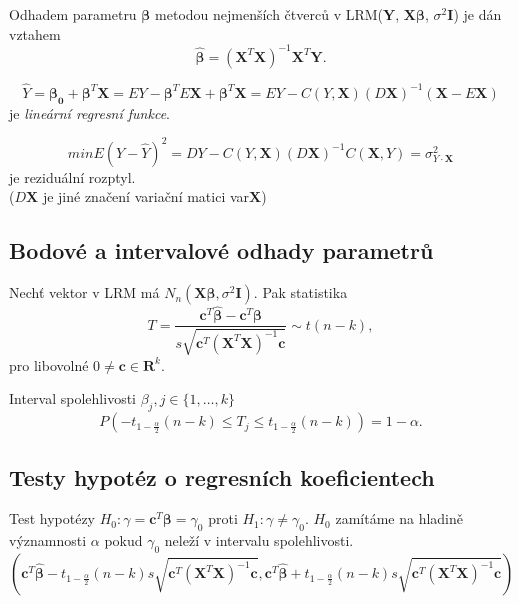 \begin{theorem}
Odhadem parametru $\pmb{\beta}$ metodou nejmenších čtverců v LRM($\mathbf{Y}$, $\mathbf{X} \pmb{\beta}$, $\sigma^2 \mathbf{I}$) je dán vztahem $$\pmb{\hat{\beta}} = \left( \mathbf{X}^T \mathbf{X} \right) ^{-1} \mathbf{X}^T \mathbf{Y}.$$
\end{theorem}

\begin{notes}$$
\hat{Y} = \mathbf{\beta_0} + \pmb{\beta}^T \mathbf{X} = E Y - \pmb{\beta}^T E \mathbf{X} + \pmb{\beta}^T \mathbf{X} = E Y - C\left( Y, \mathbf{X} \right) \left( D \mathbf{X} \right) ^ {-1} \left( \mathbf{X} - E \mathbf{X} \right)$$
je \textit{lineární regresní funkce}. 

$$min E (Y - \hat{Y})^{2} = DY - C\left( Y, \mathbf{X} \right) \left( D \mathbf{X} \right) ^ {-1} C \left( \mathbf{X}, Y \right) = \sigma^{2}_{Y \cdot \mathbf{X} }$$ je reziduální rozptyl.
\\ ($D \mathbf{X}$ je jiné značení variační matici var$\mathbf{X}$)
\end{notes}

\subsection{Bodové a intervalové odhady parametrů}
\begin{theorem}
Nechť vektor  v LRM má $N_n\left(\pmb{X} \pmb{\beta}, \sigma^2 \pmb{I} \right).$ Pak statistika $$T = \frac{\pmb{c}^T \hat{\pmb{\beta}} - \pmb{c}^T \pmb{\beta}}{s \sqrt{\pmb{c}^T \left(\pmb{X}^T \pmb{X} \right)^{-1} \pmb{c}} } \sim t \left(n-k \right),$$ pro libovolné $0 \neq \pmb{c} \in \pmb{R}^k.$ 
\end{theorem}

\begin{notes}
Interval spolehlivosti $\beta_j, j \in \{1, \ldots , k \}$ $$P\left(-t_{1-\frac{\alpha}{2}} \left(n-k \right) \leq T_j \leq t_{1-\frac{\alpha}{2}} \left(n-k \right) \right) = 1- \alpha.$$ 
\end{notes}
\subsection{Testy hypotéz o regresních koeficientech}
Test hypotézy $H_0 : \gamma = \pmb{c}^T \pmb{\beta} = \gamma_0$ proti $H_1: \gamma \neq \gamma_0$. $H_0$ zamítáme na hladině významnosti $\alpha$ pokud $\gamma_0$ neleží v intervalu spolehlivosti. 
$$\left(\pmb{c}^T \hat{\pmb{\beta}} - t_{1-\frac{\alpha}{2}} \left(n-k \right)  s \sqrt{\pmb{c}^T \left(\pmb{X}^T \pmb{X} \right)^{-1} \pmb{c}},\pmb{c}^T \hat{\pmb{\beta}} + t_{1-\frac{\alpha}{2}} \left(n-k \right) s \sqrt{\pmb{c}^T \left(\pmb{X}^T \pmb{X} \right)^{-1} \pmb{c}} \right) $$

